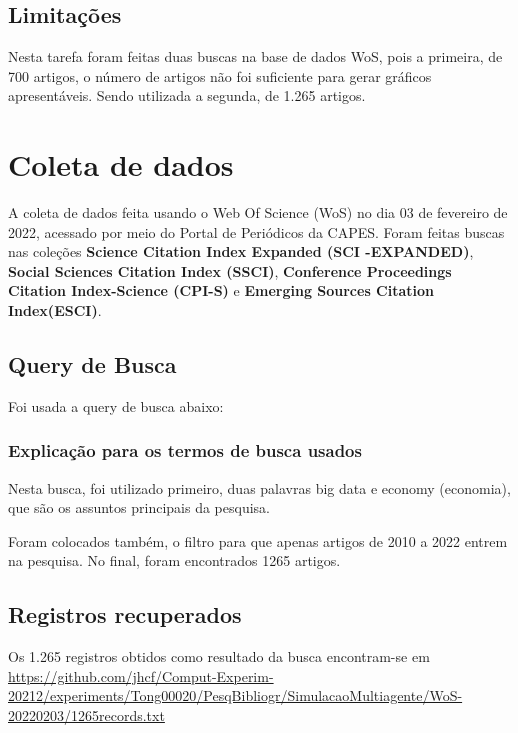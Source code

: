 \subsection{Limitações} 

Nesta tarefa foram feitas duas buscas na base de dados WoS, pois a primeira, de 700 artigos, o número de artigos não foi suficiente para gerar gráficos apresentáveis. Sendo utilizada a segunda, de 1.265 artigos.


\section{Coleta de dados}

A coleta de dados feita usando o Web Of Science (WoS) no dia 03 de fevereiro de 2022, acessado por meio do Portal de Periódicos da CAPES. Foram feitas buscas nas coleções \textbf{Science  Citation  Index  Expanded (SCI -EXPANDED)}, \textbf{Social Sciences  Citation  Index (SSCI)}, \textbf{Conference Proceedings Citation Index-Science (CPI-S)} e \textbf{Emerging Sources Citation Index(ESCI)}. 

\subsection{Query de Busca}

Foi usada a query de busca abaixo: 






\subsubsection{Explicação para os termos de busca usados}

Nesta busca, foi utilizado primeiro, duas palavras big data e economy (economia), que são os assuntos principais da pesquisa.%

Foram colocados também, o filtro para que apenas artigos de 2010 a 2022 entrem na pesquisa. No final, foram encontrados 1265 artigos.


\subsection{Registros recuperados}

Os 1.265 registros obtidos como resultado da busca encontram-se em \url{https://github.com/jhcf/Comput-Experim-20212/experiments/Tong00020/PesqBibliogr/SimulacaoMultiagente/WoS-20220203/1265records.txt}


